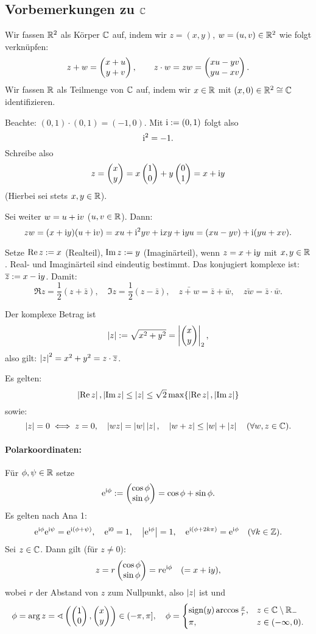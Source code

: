 \documentclass[a4paper,twoside,DIV15,BCOR12mm]{scrbook}
\begin{document}


\subsection{Vorbemerkungen zu $\mathbb{C}$}

Wir fassen $\mathbb{R}^2$ als Körper $\mathbb{C}$ auf, indem wir $z = (x,y)$, $w=(u,v)\in\mathbb{R}^2$ wie folgt verknüpfen:
\[z+w = \cmplx{x+u}{y+v},\qquad z\cdot w = zw = \cmplx{xu-yv}{yu-xv}.\]
Wir fassen $\mathbb{R}$ als Teilmenge von $\mathbb{C}$ auf, indem wir $x\in\mathbb{R}$ mit $(x,0)\in\mathbb{R}^2\cong\mathbb{C}$ identifizieren.

Beachte: $(0,1)\cdot(0,1) = (-1,0)$. Mit $\mathrm{i} := (0,1)$ folgt also
\[\mathrm{i}^2 = -1.\]
Schreibe also
\[z = \cmplx{x}{y} = x\cmplx{1}{0} + y\cmplx{0}{1} = x+\i y\]
(Hierbei sei stets $x,y\in\mathbb{R}$).

Sei weiter $w = u+\mathrm{i} v$ ($u,v\in\mathbb{R}$). Dann:
\[zw = (x+\mathrm{i} y)(u+\mathrm{i} v) = xu + \mathrm{i}^2 yv + \mathrm{i} xy + \mathrm{i} yu = (xu-yv) + \mathrm{i}(yu+xv).\]

Setze $\operatorname{Re}{z}:= x$ (Realteil), $\operatorname{Im}{z} := y$ (Imaginärteil), wenn $z=x+\mathrm{i} y$ mit $x,y\in\mathbb{R}$. Real- und Imaginärteil sind eindeutig bestimmt. Das konjugiert komplexe ist: $\overline{z}:= x-\mathrm{i} y$. Damit:
\[\Re{z} = \frac{1}{2}(z+\bar{z}),\quad\Im{z} = \frac{1}{2}(z-\bar{z}),\quad\bar{z+w} = \bar{z}+\bar{w},\quad\bar{zw}=\bar{z}\cdot\bar{w}.\]

Der komplexe Betrag ist
\[\displaystyle\left\lvert z\right\lvert:=\sqrt{x^2+y^2} = \left\lvert\left(\!\!\!\begin{array}{c}x\\y\end{array}\!\!\!\right)\right\lvert_2,\]
also gilt: $\left\lvert z\right\lvert^2 = x^2+y^2 = z\cdot\overline{z}$.


Es gelten:
\begin{equation}\label{1.1}
\left\lvert\operatorname{Re}{z}\right\lvert,\left\lvert\operatorname{Im}{z}\right\lvert\leq\left\lvert z\right\lvert\leq\sqrt{2}\max\{\left\lvert\operatorname{Re}{z}\right\lvert,\left\lvert\operatorname{Im}{z}\right\lvert\}
\end{equation}
sowie:
\[\left\lvert z\right\lvert=0\iff z = 0,\quad\left\lvert wz\right\lvert = \left\lvert w\right\lvert\left\lvert z\right\lvert,\quad\left\lvert w+z\right\lvert\leq\left\lvert w\right\lvert+\left\lvert z\right\lvert\quad(\forall w,z\in\mathbb{C}).\]

\paragraph{Polarkoordinaten:} Für $\phi,\psi\in\mathbb{R}$ setze
\[\mathrm{e}^{\mathrm{i}\phi}:=\left(\!\!\!\begin{array}{c}\cos\phi\\\sin\phi\end{array}\!\!\!\right) = \cos\phi + \sin\phi.\]
Es gelten nach Ana 1:
\[\mathrm{e}^{\mathrm{i}\phi}\mathrm{e}^{\mathrm{i}\psi} = \mathrm{e}^{\mathrm{i}(\phi+\psi)},\quad\mathrm{e}^{\mathrm{i}0} = 1,\quad\bigl|\mathrm{e}^{\mathrm{i}\phi}\bigr| = 1,\quad\mathrm{e}^{\mathrm{i}(\phi+2k\pi)} = \mathrm{e}^{\mathrm{i}\phi}\quad(\forall k\in\mathbb{Z}).\]
Sei $z\in\mathbb{C}$. Dann gilt (für $z\neq 0$):
\[z = r\left(\!\!\!\begin{array}{c}\cos\phi\\\sin\phi\end{array}\!\!\!\right) = r\mathrm{e}^{\mathrm{i}\phi}\quad(=x+\mathrm{i} y),\]
wobei $r$ der Abstand von $z$ zum Nullpunkt, also $\left\lvert z\right\lvert$ ist und
\[\phi = \arg{z} = \sphericalangle\left(\cmplx{1}{0},\cmplx{x}{y}\right)\in(-\pi,\pi],\quad\phi = \begin{cases}\sign(y)\arccos\frac{x}{r},&z\in\C\setminus\R_-\\\pi,&z\in(-\infty,0).\end{cases}\]
\end{document}
